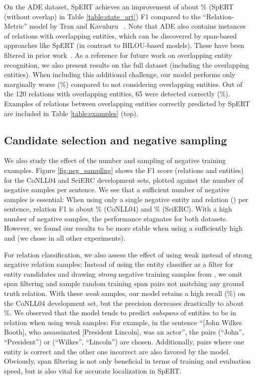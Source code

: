 \documentclass{ecai}
\begin{document}
On the ADE dataset, SpERT achieves an improvement of about \% (SpERT (without overlap) in Table \ref{table:state_art}) F1 compared to the \enquote{Relation-Metric} model by Tran and Kavuluru ~\cite{tran:2019:metric_learning}. Note that ADE also contains  instances of relations with overlapping entities, which can be discovered by span-based approaches like SpERT (in contrast to BILOU-based models). These have been filtered in prior work~\cite{bekoulis:2018:multi_head,li:2017:joint_bio,tran:2019:metric_learning}.
As a reference for future work on overlapping entity recognition, we also present results on the full dataset (including the overlapping entities). When including this additional challenge, our model performs only marginally worse (\%) compared to not considering overlapping entities. Out of the 120 relations with overlapping entities, 65 were detected correctly (\%). Examples of relations between overlapping entities correctly predicted by SpERT are included in Table \ref{table:examples} (top).

\subsection{Candidate selection and negative sampling}

We also study the effect of the number and sampling of negative training examples. Figure \ref{fig:neg_sampling} shows the F1 score (relations and entities) for the CoNLL04 and SciERC development sets, plotted against the number of negative samples  per sentence. We see that a sufficient number of negative samples is essential: When using only a single negative entity and relation () per sentence, relation F1 is about \% (CoNLL04) and \% (SciERC). With a high number of negative samples, the performance stagnates for both datasets. However, we found our results to be more stable when using a sufficiently high  and  (we chose  in all other experiments).


For relation classification, we also assess the effect of using weak instead of strong negative relation samples: Instead of using the entity classifier as a filter for entity candidates  and drawing {\it strong} negative training samples from , we omit span filtering and sample random training span pairs not matching any ground truth relation. 
With these {\it weak} samples, our model retains a high recall (\%) on the CoNLL04 development set, but the precision decreases drastically to about \%. We observed that the model tends to predict {\it subspans} of entities to be in relation when using weak samples: For example, in the sentence \enquote{[John Wilkes Booth], who assassinated [President Lincoln], was an actor}, the pairs (\enquote{John}, \enquote{President}) or (\enquote{Wilkes}, \enquote{Lincoln}) are chosen. Additionally, pairs where one entity is correct and the other one incorrect are also favored by the model. Obviously, span filtering is not only beneficial in terms of training and evaluation speed, but is also vital for accurate localization in SpERT.
\end{document}
